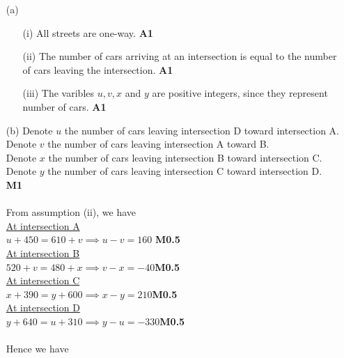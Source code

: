 \documentclass[12pt]{exam}
\begin{document}
\begin{questions}
\begin{solution}
	\begin{enumerate}
		\item[(a)]
		\begin{enumerate}
			\item[(i)] All streets are one-way. \hfill \textbf{A1}
			\item[(ii)]The number of cars arriving at an intersection is equal to the number of cars leaving the intersection. \hfill \textbf{A1}
			\item[(iii)]The varibles $u, v, x$ and $y$ are positive integers, since they represent number of cars. \hfill \textbf{A1}
		\end{enumerate}
		\item[(b)] Denote $u$ the number of cars leaving intersection D toward intersection A.\\
		Denote $v$ the number of cars leaving intersection A toward B.\\
		Denote $x$ the number of cars leaving intersection B toward intersection C.\\
		Denote $y$ the number of cars leaving intersection C toward intersection D. \hfill \textbf{M1}\\ \\
		From assumption (ii), we have\\
		\underline{At intersection A}\\
		$u+450 = 610+v \implies u-v=160$ \hfill \textbf{M0.5}\\
		\underline{At intersection B}\\
		$520+v = 480+x \implies v-x=-40$\hfill \textbf{M0.5}\\
		\underline{At intersection C}\\
		$x+390= y+600 \implies x-y=210$\hfill \textbf{M0.5}\\
		\underline{At intersection D}\\
		$y+640 = u+310 \implies y-u=-330$\hfill \textbf{M0.5}\\ \\
		Hence we have\\
		\begin{align*}

\end{align*}
\end{enumerate}
\end{solution}
\end{questions}
\end{document}
